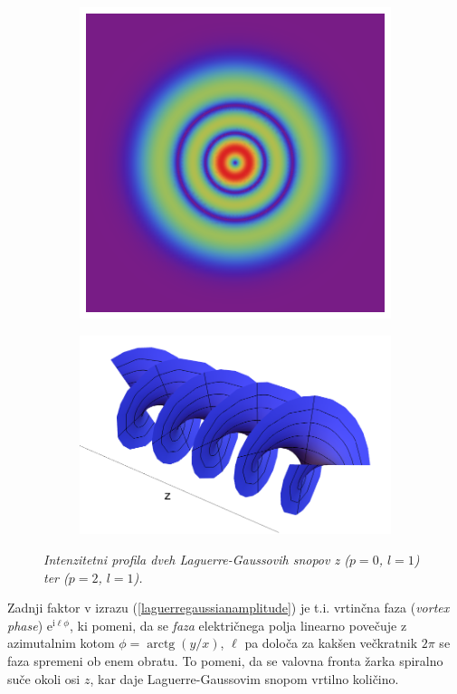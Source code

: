\documentclass[longbibliography,slovene,a4paper,12pt]{book}
\newcommand{\E}{\text{e}}
\newcommand{\I}{\text{i}}
\DeclareMathOperator{\arctg}{arctg}
\begin{document}
\begin{figure}[h!]
\begin{subfigure}[b]{0.31\textwidth}
	\includegraphics[width=\textwidth]{slike/lg_21.png}
	\label{fig:lg_21beam}
	\end{subfigure}
	\begin{subfigure}[b]{0.35\textwidth}
	\includegraphics[width=\textwidth]{slike/helical_beam.png}
	\label{fig:lg_01azimuthalbeam}
	\end{subfigure}
	\caption{\emph{Intenzitetni profila dveh Laguerre-Gaussovih snopov z ($p = 0$, $l=1$) ter ($p=2$, $l=1$).}}
\end{figure} 
Zadnji faktor v izrazu (\ref{laguerregaussianamplitude}) je t.i. vrtinčna faza (\emph{vortex phase}) $\E^{\I \ell \phi}$, ki pomeni, da se \emph{faza} električnega polja linearno povečuje z azimutalnim kotom $\phi = \arctg(y/x)$, $\ell$ pa določa za kakšen večkratnik $2\pi$ se faza spremeni ob enem obratu. To pomeni, da se valovna fronta žarka spiralno suče okoli osi $z$, kar daje Laguerre-Gaussovim snopom vrtilno količino\cite{saleh}.\\
\end{document}
